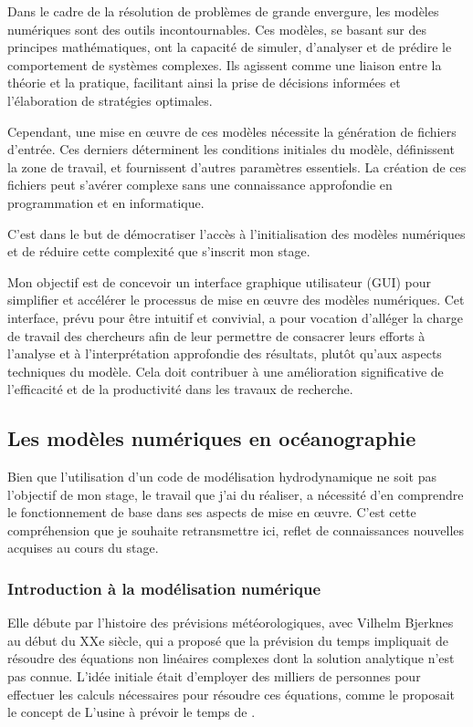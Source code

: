Dans le cadre de la résolution de problèmes de grande envergure, les modèles numériques sont des outils incontournables. Ces modèles, se basant sur des principes mathématiques, ont la capacité de simuler, d'analyser et de prédire le comportement de systèmes complexes. Ils agissent comme une liaison entre la théorie et la pratique, facilitant ainsi la prise de décisions informées et l'élaboration de stratégies optimales.

Cependant, une mise en \oe{uvre} de ces modèles nécessite la génération de fichiers d'entrée. Ces derniers déterminent les conditions initiales du modèle, définissent la zone de travail, et fournissent d'autres paramètres essentiels. La création de ces fichiers peut s'avérer complexe sans une connaissance approfondie en programmation et en informatique.

C'est dans le but de démocratiser l'accès à l'initialisation des modèles numériques et de réduire cette complexité que s'inscrit mon stage.

Mon objectif est de concevoir un interface graphique utilisateur (GUI) pour simplifier et accélérer le processus de mise en \oe{uvre} des modèles numériques. Cet interface, prévu pour être intuitif et convivial, a pour vocation d'alléger la charge de travail des chercheurs afin de leur permettre de consacrer leurs efforts à l'analyse et à l'interprétation approfondie des résultats, plutôt qu'aux aspects techniques du modèle. Cela doit contribuer à une amélioration significative de l'efficacité et de la productivité dans les travaux de recherche.

\subsection{Les modèles numériques en océanographie}

Bien que l'utilisation d'un code de modélisation hydrodynamique ne soit pas l'objectif de mon stage, le travail que j'ai du réaliser, a nécessité d'en comprendre le fonctionnement de base dans ses aspects de mise en \oe{uvre}. C'est cette compréhension que je souhaite retransmettre ici, reflet de connaissances nouvelles acquises au cours du stage.

\subsubsection{Introduction à la modélisation numérique}

Elle débute par l'histoire des prévisions météorologiques, avec Vilhelm Bjerknes \citep{bjerknes1970} au début du XXe siècle, qui a proposé que la prévision du temps impliquait de résoudre des équations non linéaires complexes dont la solution analytique n'est pas connue. L'idée initiale était d'employer des milliers de personnes pour effectuer les calculs nécessaires pour résoudre ces équations, comme le proposait le concept de \og L'usine à prévoir le temps \fg{} de  \citep{richardson1922}.

